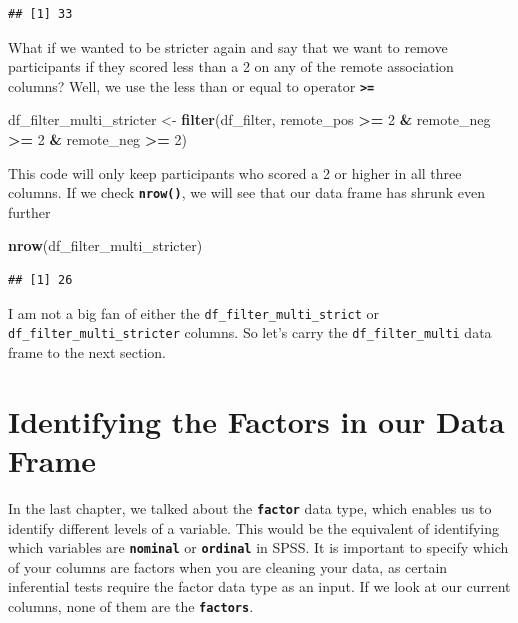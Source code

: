 \documentclass[
]{book}
\newenvironment{Shaded}{\begin{snugshade}}{\end{snugshade}}
\newcommand{\DecValTok}[1]{\textcolor[rgb]{0.00,0.00,0.81}{#1}}
\newcommand{\FunctionTok}[1]{\textcolor[rgb]{0.13,0.29,0.53}{\textbf{#1}}}
\newcommand{\NormalTok}[1]{#1}
\newcommand{\OtherTok}[1]{\textcolor[rgb]{0.56,0.35,0.01}{#1}}
\newcommand{\SpecialCharTok}[1]{\textcolor[rgb]{0.81,0.36,0.00}{\textbf{#1}}}
\begin{document}
\begin{verbatim}
## [1] 33
\end{verbatim}

What if we wanted to be stricter again and say that we want to remove participants if they scored less than a 2 on any of the remote association columns? Well, we use the less than or equal to operator \textbf{\texttt{\textgreater{}=}}

\begin{Shaded}
\begin{Highlighting}[]
\NormalTok{df\_filter\_multi\_stricter }\OtherTok{\textless{}{-}} \FunctionTok{filter}\NormalTok{(df\_filter, remote\_pos }\SpecialCharTok{\textgreater{}=} \DecValTok{2} \SpecialCharTok{\&}\NormalTok{ remote\_neg }\SpecialCharTok{\textgreater{}=} \DecValTok{2} \SpecialCharTok{\&}\NormalTok{ remote\_neg }\SpecialCharTok{\textgreater{}=} \DecValTok{2}\NormalTok{)}
\end{Highlighting}
\end{Shaded}

This code will only keep participants who scored a 2 or higher in all three columns. If we check \textbf{\texttt{nrow()}}, we will see that our data frame has shrunk even further

\begin{Shaded}
\begin{Highlighting}[]
\FunctionTok{nrow}\NormalTok{(df\_filter\_multi\_stricter)}
\end{Highlighting}
\end{Shaded}

\begin{verbatim}
## [1] 26
\end{verbatim}

I am not a big fan of either the \texttt{df\_filter\_multi\_strict} or \texttt{df\_filter\_multi\_stricter} columns. So let's carry the \texttt{df\_filter\_multi} data frame to the next section.

\section{Identifying the Factors in our Data Frame}\label{identifying-the-factors-in-our-data-frame}

In the last chapter, we talked about the \textbf{\texttt{factor}} data type, which enables us to identify different levels of a variable. This would be the equivalent of identifying which variables are \textbf{\texttt{nominal}} or \textbf{\texttt{ordinal}} in SPSS. It is important to specify which of your columns are factors when you are cleaning your data, as certain inferential tests require the factor data type as an input. If we look at our current columns, none of them are the \textbf{\texttt{factors}}.
\end{document}
